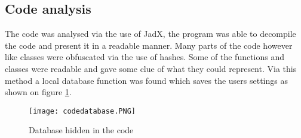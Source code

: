 \subsection{Code analysis}

The code was analysed via the use of JadX, the program was able to decompile the code and present it in a readable manner. 
Many parts of the code however like classes were obfuscated via the use of hashes. 
Some of the functions and classes were readable and gave some clue of what they could represent. 
Via this method a local database function was found which saves the users settings as shown on figure \ref{tim-database}.

\begin{figure}[H]
    \texttt{[image: codedatabase.PNG]}
    \caption{Database hidden in the code}
    \label{tim-database}
\end{figure}